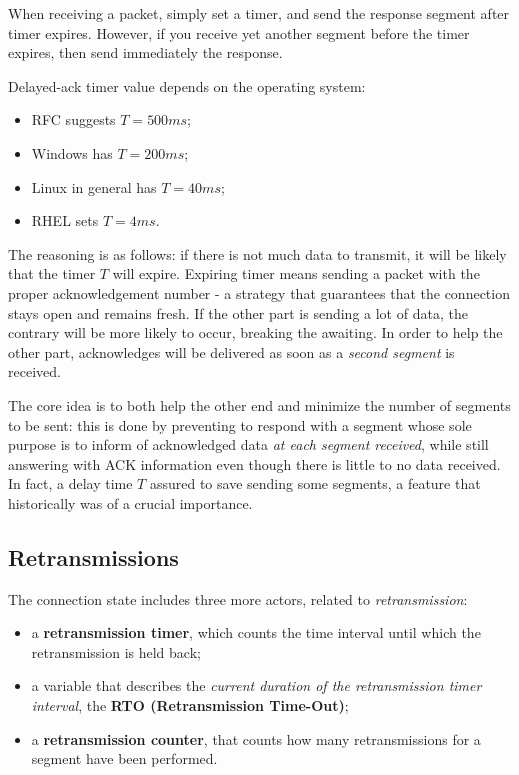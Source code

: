 \documentclass[10pt]{extreport}
\begin{document}
When receiving a packet, simply set a timer, and send the response segment
after timer expires. However, if you receive yet another segment before the
timer expires, then send immediately the response.

Delayed-ack timer value depends on the operating system:

\begin{itemize}
    \item RFC suggests $T = 500ms$;
    \item Windows has $T = 200ms$;
    \item Linux in general has $T = 40ms$;
    \item RHEL sets $T = 4ms$.
\end{itemize}

The reasoning is as follows: if there is not much data to transmit, it will be
likely that the timer $T$ will expire. Expiring timer means sending a packet
with the proper acknowledgement number \-- a strategy that guarantees that the
connection stays open and remains fresh. If the other part is sending a lot of
data, the contrary will be more likely to occur, breaking the awaiting. In
order to help the other part, acknowledges will be delivered as soon as a
\emph{second segment} is received. 

The core idea is to both help the other end and
minimize the number of segments to be sent: this is done by preventing to
respond with a segment whose sole purpose is to inform of acknowledged data
\emph{at each segment received}, while still answering with ACK information
even though there is little to no data received. In fact, a delay time $T$
assured to save sending some segments, a feature that historically was of a
crucial importance.

\subsection{Retransmissions}

The connection state includes three more actors, related to
\emph{retransmission}:

\begin{itemize}
    \item a \textbf{retransmission timer}, which counts the time interval until
        which the retransmission is held back;
	\item a variable that describes the \emph{current duration of the retransmission
        timer interval}, the \textbf{RTO (Retransmission Time-Out)};
    \item a \textbf{retransmission counter}, that counts how many
        retransmissions for a segment have been performed.
\end{itemize}
\end{document}
